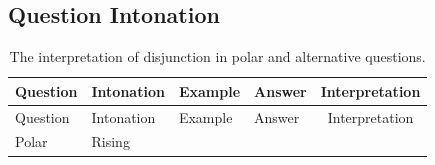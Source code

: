 \documentclass[oneside]{report}
\theoremstyle{definition}
\theoremstyle{definition}
\theoremstyle{definition}
\theoremstyle{remark}
\begin{document}
\subsection{Question Intonation}\label{question-intonation}
\begin{longtable}[]{@{}llllc@{}}
\caption{\label{tab:questions} The interpretation of disjunction in polar
and alternative questions.}\tabularnewline
\toprule
\begin{minipage}[b]{0.12\columnwidth}\raggedright\strut
Question\strut
\end{minipage} & \begin{minipage}[b]{0.11\columnwidth}\raggedright\strut
Intonation\strut
\end{minipage} & \begin{minipage}[b]{0.39\columnwidth}\raggedright\strut
Example\strut
\end{minipage} & \begin{minipage}[b]{0.10\columnwidth}\raggedright\strut
Answer\strut
\end{minipage} & \begin{minipage}[b]{0.14\columnwidth}\centering\strut
Interpretation\strut
\end{minipage}\tabularnewline
\midrule
\endfirsthead
\toprule
\begin{minipage}[b]{0.12\columnwidth}\raggedright\strut
Question\strut
\end{minipage} & \begin{minipage}[b]{0.11\columnwidth}\raggedright\strut
Intonation\strut
\end{minipage} & \begin{minipage}[b]{0.39\columnwidth}\raggedright\strut
Example\strut
\end{minipage} & \begin{minipage}[b]{0.10\columnwidth}\raggedright\strut
Answer\strut
\end{minipage} & \begin{minipage}[b]{0.14\columnwidth}\centering\strut
Interpretation\strut
\end{minipage}\tabularnewline
\midrule
\endhead
\begin{minipage}[t]{0.12\columnwidth}\raggedright\strut
Polar\strut
\end{minipage} & \begin{minipage}[t]{0.11\columnwidth}\raggedright\strut
Rising\strut
\end{minipage} & \begin{minipage}[t]{0.39\columnwidth}\raggedright\strut

\end{minipage}
\end{longtable}
\end{document}
